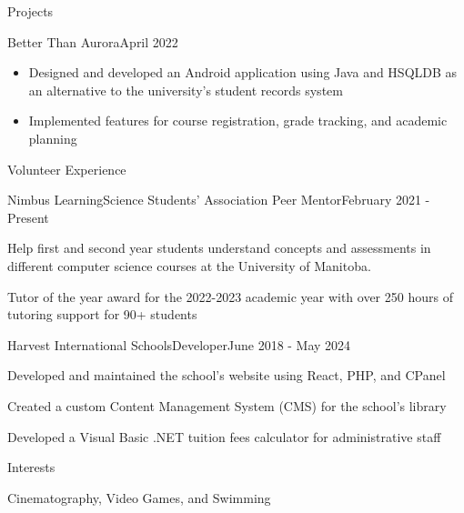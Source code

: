 \documentclass{article}
\newlength{\tabin}
\newlength{\secsep}
\newcommand{\lineunder}{\vspace*{-8pt} \\ \hspace*{-6pt} \hrulefill \\ \vspace*{-15pt}}
\newenvironment{tabbedsection}[1]{
    \begin{list}{}{
        \setlength{\itemsep}{0pt}
        \setlength{\labelsep}{0pt}
        \setlength{\labelwidth}{0pt}
        \setlength{\leftmargin}{\tabin}
        \setlength{\rightmargin}{\tabin}
        \setlength{\listparindent}{0pt}
        \setlength{\parsep}{0pt}
        \setlength{\parskip}{0pt}
        \setlength{\partopsep}{0pt}
        \setlength{\topsep}{#1}
    }
        \item[]
        }{
    \end{list}}
\newenvironment{nospacetabbing}{
    \begin{tabbing}
    }{\end{tabbing}\vspace{-1.2em}}
\newenvironment{resume_section}[1]{
    \vspace{2\secsep}
    \textsc{\large#1}
    \lineunder
    \begin{tabbedsection}{\secsep}
    }{\end{tabbedsection}}
\newenvironment{resume_subsection}[2]{
    \begin{minipage}[t]{0.75\linewidth}
        \textbf{#1}
    \end{minipage}%
    \begin{minipage}[t]{0.25\linewidth}
        \hfill \footnotesize #2
    \end{minipage}
    \begin{tabbedsection}{0.5\secsep}
    }{\end{tabbedsection}}
\newenvironment{subitems}{
    \renewcommand{\labelitemi}{-}
    \begin{itemize}
        \setlength{\labelsep}{1em}
        }{
    \end{itemize}}
\newenvironment{resume_employer}[4]{
    \filbreak
    \vspace{\secsep}
    \begin{minipage}[t]{0.75\linewidth}
        \textbf{#1}\\
        \small #2
    \end{minipage}%
    \begin{minipage}[t]{0.25\linewidth}
        \hfill \footnotesize #4
    \end{minipage}
    \vspace{0.1em}\\
    \begin{tabbedsection}{0pt}
        \begin{subitems}
        }{\end{subitems}
    \end{tabbedsection}}
\begin{document}
\begin{resume_section}{Projects}
        \begin{resume_subsection}{Better Than Aurora}{April 2022}
            \begin{subitems}
                \item Designed and developed an Android application using Java and HSQLDB as an alternative to the university's student records system
                \item Implemented features for course registration, grade tracking, and academic planning
            \end{subitems}
        \end{resume_subsection}
    \end{resume_section}

    \begin{resume_section}{Volunteer Experience}
        \begin{resume_employer}{Nimbus Learning}{Science Students' Association Peer Mentor}{}{February 2021 - Present}
            \item Help first and second year students understand concepts and assessments in different computer
            science courses at the University of Manitoba.
            \item Tutor of the year award for the 2022-2023 academic year with over 250 hours of tutoring support for 90+ students
        \end{resume_employer}

        \begin{resume_employer}{Harvest International Schools}{Developer}{}{June 2018 - May 2024}
            \item Developed and maintained the school's website using React, PHP, and CPanel
            \item Created a custom Content Management System (CMS) for the school's library
            \item Developed a Visual Basic .NET tuition fees calculator for administrative staff
        \end{resume_employer}
    \end{resume_section}

    \begin{resume_section}{Interests}
        \begin{nospacetabbing}
            Cinematography, Video Games, and Swimming
        \end{nospacetabbing}
    \end{resume_section}
\end{document}
